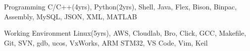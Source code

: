 

\begin{resumeskills}

  \resumeskill
    {Programming} %
    {C/C++(4yrs), Python(2yrs), Shell, Java, Flex, Bison, Binpac, Assembly, MySQL, JSON, XML, MATLAB} %



  \resumeskill
    {Working Environment} %
    {Linux(5yrs), AWS, Cloudlab, Bro, Click, GCC, Makefile, Git, SVN, gdb, ucos, VxWorks, ARM STM32, VS Code, Vim, Keil} %




\end{resumeskills}
